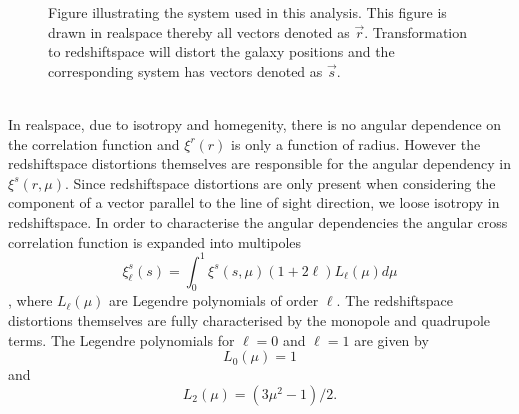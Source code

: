 \begin{figure}\label{fig:corrpair}
    \caption{Figure illustrating the system used in this analysis. This
    figure is drawn in realspace thereby all vectors denoted as $\vec{r}$.
    Transformation to redshiftspace will distort the galaxy positions and the
    corresponding system has vectors denoted as $\vec{s}$.}
\end{figure}
\\\indent
In realspace, due to isotropy and homegenity, there is no angular dependence on the correlation function and $\xi^r(r)$ is only a function of radius. However the redshiftspace distortions themselves are responsible for the angular dependency in $\xi^s(r,\mu)$. Since redshiftspace distortions are only present when considering the component of a vector parallel to the line of sight direction, we loose isotropy in redshiftspace. In order to characterise the angular dependencies the angular cross correlation function is expanded into multipoles
\begin{equation}
    \xi^s_\ell(s)=\int_0^1\xi^s(s,\mu)(1+2\ell)L_\ell(\mu)d\mu
\end{equation}
\cite{Nadathur_corr}, where $L_\ell(\mu)$ are Legendre polynomials
of order $\ell$. The redshiftspace distortions themselves are fully characterised by the monopole and quadrupole terms\cite{Hamaus_2017}. The Legendre polynomials for $\ell=0$ and
$\ell=1$ are given by
\begin{equation}
    L_0(\mu)=1
\end{equation}
and
\begin{equation}
    L_2(\mu)=(3\mu^2-1)/2.
\end{equation}
